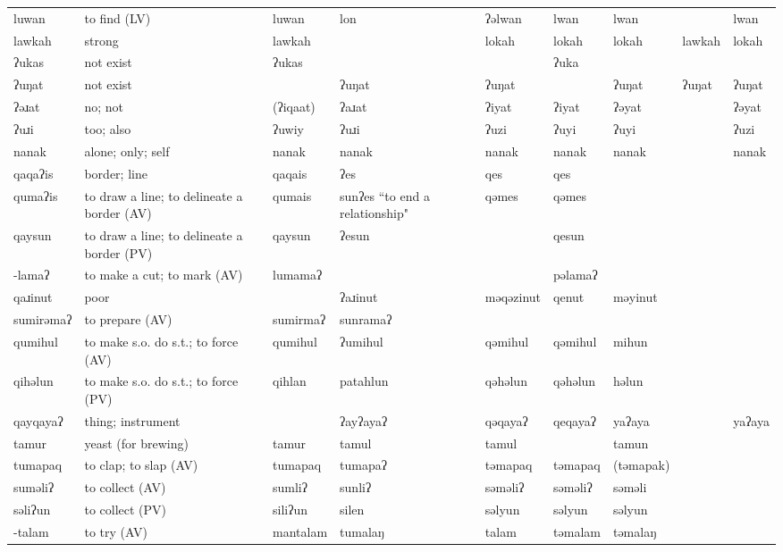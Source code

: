 \begin{landscape}
\begin{longtable}{*{9}{p{}}}
\text{*}luwan & to find (LV) & luwan & lon & ʔəlwan & lwan & lwan &  & lwan\\
\text{*}lawkah & strong & lawkah &  & lokah & lokah & lokah & lawkah & lokah\\
\text{*}ʔukas & not exist & ʔukas &  &  & ʔuka &  &  & \\
\text{*}ʔuŋat & not exist &  & ʔuŋat & ʔuŋat &  & ʔuŋat & ʔuŋat & ʔuŋat\\
\text{*}ʔəɹat & no; not & (ʔiqaat) & ʔaɹat & ʔiyat & ʔiyat & ʔəyat &  & ʔəyat\\
\text{*}ʔuɹi & too; also & ʔuwiy & ʔuɹi & ʔuzi & ʔuyi & ʔuyi &  & ʔuzi\\
\text{*}nanak & alone; only; self & nanak & nanak & nanak & nanak & nanak &  & nanak\\
\text{*}qaqaʔis & border; line & qaqais & ʔes & qes & qes &  &  & \\
\text{*}qumaʔis & to draw a line; to delineate a border (AV) & qumais & sunʔes ``to end a relationship" & qəmes & qəmes &  &  & \\
\text{*}qaysun & to draw a line; to delineate a border (PV) & qaysun & ʔesun &  & qesun &  &  & \\
\text{*}-lamaʔ & to make a cut; to mark (AV) & lumamaʔ &  &  & pəlamaʔ &  &  & \\
\text{*}qaɹinut & poor &  & ʔaɹinut & məqəzinut & qenut & məyinut &  & \\
\text{*}sumirəmaʔ & to prepare (AV) & sumirmaʔ & sunramaʔ &  &  &  &  & \\
\text{*}qumihul & to make s.o. do s.t.; to force (AV) & qumihul & ʔumihul & qəmihul & qəmihul & mihun &  & \\
\text{*}qihəlun & to make s.o. do s.t.; to force (PV) & qihlan & patahlun & qəhəlun & qəhəlun & həlun &  & \\
\text{*}qayqayaʔ & thing; instrument &  & ʔayʔayaʔ & qəqayaʔ & qeqayaʔ & yaʔaya &  & yaʔaya\\
\text{*}tamur & yeast (for brewing) & tamur & tamul & tamul &  & tamun &  & \\
\text{*}tumapaq & to clap; to slap (AV) & tumapaq & tumapaʔ & təmapaq & təmapaq & (təmapak) &  & \\
\text{*}suməliʔ & to collect (AV) & sumliʔ & sunliʔ & səməliʔ & səməliʔ & səməli &  & \\
\text{*}səliʔun & to collect (PV) & siliʔun & silen & səlyun & səlyun & səlyun &  & \\
\text{*}-talam & to try (AV) & mantalam & tumalaŋ & talam & təmalam & təmalaŋ &  & \\

\end{longtable}
\end{landscape}
